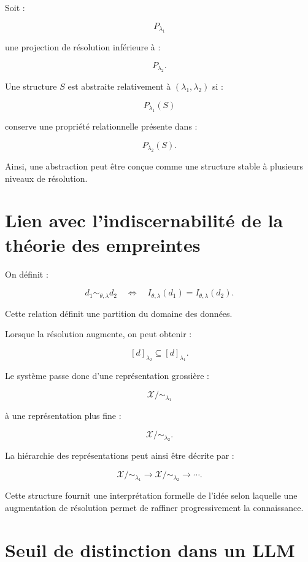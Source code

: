 \documentclass[11pt,a4paper]{article}
\newcommand{\X}{\mathcal X}
\begin{document}
Soit :

\[
P_{\lambda_1}
\]

une projection de résolution inférieure à :

\[
P_{\lambda_2}.
\]

Une structure $S$ est abstraite relativement à
$(\lambda_1,\lambda_2)$ si :

\[
P_{\lambda_1}(S)
\]

conserve une propriété relationnelle présente dans :

\[
P_{\lambda_2}(S).
\]

Ainsi, une abstraction peut être conçue comme une structure stable à
plusieurs niveaux de résolution.

\section{Lien avec l'indiscernabilité de la théorie des empreintes}

On définit :

\[
d_1
\sim_{\theta,\lambda}
d_2
\quad\Longleftrightarrow\quad
I_{\theta,\lambda}(d_1)
=
I_{\theta,\lambda}(d_2).
\]

Cette relation définit une partition du domaine des données.

Lorsque la résolution augmente, on peut obtenir :

\[
[d]_{\lambda_2}
\subseteq
[d]_{\lambda_1}.
\]

Le système passe donc d'une représentation grossière :

\[
\X/{\sim_{\lambda_1}}
\]

à une représentation plus fine :

\[
\X/{\sim_{\lambda_2}}.
\]

La hiérarchie des représentations peut ainsi être décrite par :

\[
\X/{\sim_{\lambda_1}}
\longrightarrow
\X/{\sim_{\lambda_2}}
\longrightarrow
\cdots.
\]

Cette structure fournit une interprétation formelle de l'idée selon laquelle
une augmentation de résolution permet de raffiner progressivement la
connaissance.

\section{Seuil de distinction dans un LLM}
\end{document}
